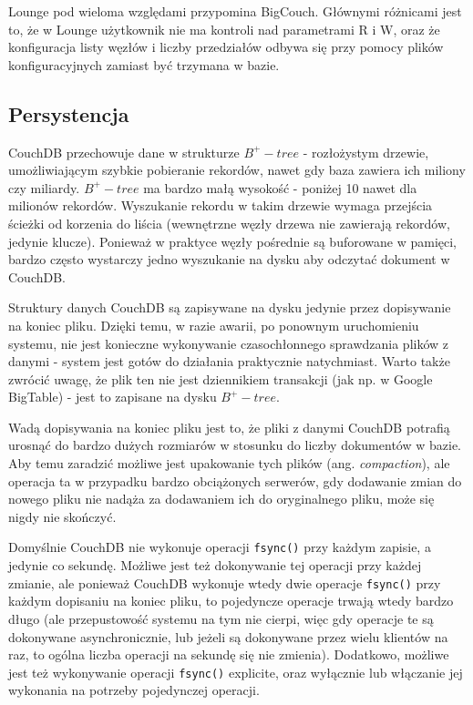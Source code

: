 Lounge pod wieloma względami przypomina BigCouch.
Głównymi różnicami jest to, że w Lounge użytkownik nie ma kontroli nad parametrami R i W, oraz że konfiguracja listy węzłów i liczby przedziałów odbywa się przy pomocy plików konfiguracyjnych zamiast być trzymana w bazie.

\subsection*{Persystencja}

CouchDB przechowuje dane w strukturze $B^+-tree$ - rozłożystym drzewie, umożliwiającym szybkie pobieranie rekordów, nawet gdy baza zawiera ich miliony czy miliardy.
$B^+-tree$ ma bardzo małą wysokość - poniżej 10 nawet dla milionów rekordów.
Wyszukanie rekordu w takim drzewie wymaga przejścia ścieżki od korzenia do liścia (wewnętrzne węzły drzewa nie zawierają rekordów, jedynie klucze).
Ponieważ w praktyce węzły pośrednie są buforowane w pamięci, bardzo często wystarczy jedno wyszukanie na dysku aby odczytać dokument w CouchDB.

Struktury danych CouchDB są zapisywane na dysku jedynie przez dopisywanie na koniec pliku.
Dzięki temu, w razie awarii, po ponownym uruchomieniu systemu, nie jest konieczne wykonywanie czasochłonnego sprawdzania plików z danymi - system jest gotów do działania praktycznie natychmiast.
Warto także zwrócić uwagę, że plik ten nie jest dziennikiem transakcji (jak np. w Google BigTable) - jest to zapisane na dysku $B^+-tree$.

Wadą dopisywania na koniec pliku jest to, że pliki z danymi CouchDB potrafią urosnąć do bardzo dużych rozmiarów w stosunku do liczby dokumentów w bazie.
Aby temu zaradzić możliwe jest upakowanie tych plików (ang. \emph{compaction}), ale operacja ta w przypadku bardzo obciążonych serwerów, gdy dodawanie zmian do nowego pliku nie nadąża za dodawaniem ich do oryginalnego pliku, może się nigdy nie skończyć.

Domyślnie CouchDB nie wykonuje operacji \verb+fsync()+ przy każdym zapisie, a jedynie co sekundę.
Możliwe jest też dokonywanie tej operacji przy każdej zmianie, ale ponieważ CouchDB wykonuje wtedy dwie operacje \verb+fsync()+ przy każdym dopisaniu na koniec pliku, to pojedyncze operacje trwają wtedy bardzo długo (ale przepustowość systemu na tym nie cierpi, więc gdy operacje te są dokonywane asynchronicznie, lub jeżeli są dokonywane przez wielu klientów na raz, to ogólna liczba operacji na sekundę się nie zmienia).
Dodatkowo, możliwe jest też wykonywanie operacji \verb+fsync()+ explicite, oraz wyłącznie lub włączanie jej wykonania na potrzeby pojedynczej operacji. 

